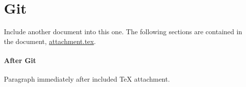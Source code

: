 \documentclass[10pt,a4paper]{article}
\begin{document}
\sectionbreak{}

\section*{Git}

Include another \LaTeXe{} document into this one. The following sections are
contained in the document, \href{run:./attachment.tex}{attachment.tex}.



\paragraph{After Git}
Paragraph immediately after included \TeX{} attachment.
\end{document}
